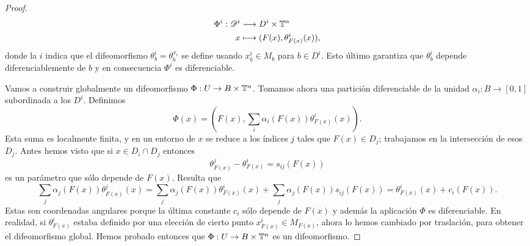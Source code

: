 \begin{proof}
\begin{align*}
	 \Phi^i :\mathscr{D}^i&\longrightarrow D^i\times \mathbb{T}^n\\ 
	 x &\longmapsto (F(x),\theta^i_{F(x)}(x)),
	 \end{align*}
	 donde la $i$ indica que el difeomorfismo $\theta^i_b=\theta^{x_i}_b$ se define usando $x^i_b\in M_b$ para $b\in D^i$. Esto último garantiza que $\theta^i_b$ depende diferenciablemente de $b$ y en consecuencia $\Phi^i$ es diferenciable. 
	 \begin{center}
	 \end{center}
	 
	 Vamos a construir globalmente un difeomorfismo $\Phi:U\rightarrow B\times \mathbb{T}^n$. Tomamos ahora  una partición diferenciable de la unidad $\alpha_i:B\rightarrow [0,1]$ subordinada a los $D^i$. Definimos
	 \begin{equation*}
	   \Phi(x)=\left( F(x),\sum_i\alpha_i(F(x))\theta^i_{F(x)}(x) \right).
	 \end{equation*}
	 Esta suma es localmente finita, y en un entorno de $x$ se reduce a los índices $j$ tales que $F(x)\in D_j$; trabajamos en la intersección de esos $D_j$. Antes hemos visto que si $x\in D_i \cap D_j$ entonces 
	 \begin{equation*}
	   \theta^j_{F(x)}-\theta^i_{F(x)}=s_{ij}(F(x))
	 \end{equation*}
	 es un parámetro que sólo depende de $F(x)$. Resulta que
	 \begin{equation*}
	   \sum_j \alpha_j(F(x))\theta^j_{F(x)}(x)=\sum_j \alpha_j(F(x))\theta^i_{F(x)}(x)+\sum_j \alpha_j(F(x))s_{ij}(F(x))=\theta^i_{F(x)}(x)+c_i(F(x)).
	 \end{equation*}
	 Estas son coordenadas angulares porque la última constante $c_i$ sólo depende de $F(x)$ y además la aplicación $\Phi$ es diferenciable. En realidad, si $\theta^i_{F(x)}$ estaba definido por una elección de cierto punto $x^i_{F(x)}\in M_{F(x)}$, ahora lo hemos cambiado por traslación, para obtener el difeomorfismo global. Hemos probado entonces que $\Phi:U\rightarrow B\times \mathbb{T}^n$ es un difeomorfismo.
	 

\end{proof}
